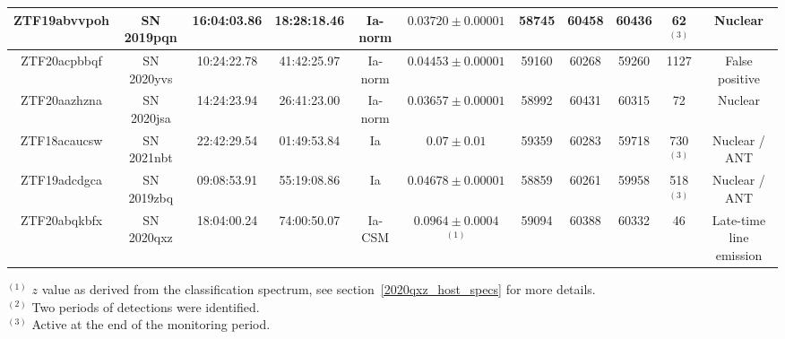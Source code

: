 \documentclass[a4paper,oneside,12pt, class=Latex/Classes/PhDthesisPSnPDF, crop=false]{standalone}
\begin{document}
\begin{table}
{\begin{tabular}{ccccccccccc}
        ZTF19abvvpoh & SN 2019pqn & 16:04:03.86 & 18:28:18.46 & Ia-norm & $0.03720\pm0.00001$ & 58745 & 60458 & 60436 & 62 $^{(3)}$ & Nuclear\\
        \hline
        ZTF20acpbbqf & SN 2020yvs & 10:24:22.78 & 41:42:25.97 & Ia-norm & $0.04453\pm0.00001$ & 59160 & 60268 & 59260 & 1127 & False positive\\
        ZTF20aazhzna & SN 2020jsa & 14:24:23.94 & 26:41:23.00 & Ia-norm & $0.03657\pm0.00001$ & 58992 & 60431 & 60315 & 72 & Nuclear\\
        ZTF18acaucsw & SN 2021nbt & 22:42:29.54 & 01:49:53.84 & Ia & $0.07\pm0.01$ & 59359 & 60283 & 59718 & 730 $^{(3)}$ & Nuclear / ANT\\
        ZTF19adcdgca & SN 2019zbq & 09:08:53.91 & 55:19:08.86 & Ia & $0.04678\pm0.00001$ & 58859 & 60261 & 59958 & 518 $^{(3)}$ & Nuclear / ANT \\
        ZTF20abqkbfx & SN 2020qxz & 18:04:00.24 & 74:00:50.07 & Ia-CSM & $0.0964\pm0.0004$ $^{(1)}$ & 59094 & 60388 & 60332 & 46 & Late-time line emission \\
        \hline
    \end{tabular}
    }
    \begin{flushleft}
        $^{(1)}$ $z$ value as derived from the classification spectrum, see section~\ref{2020qxz_host_specs} for more details.\\
        $^{(2)}$ Two periods of detections were identified.\\
        $^{(3)}$ Active at the end of the monitoring period.
    \end{flushleft}
    \label{found_objs}
\end{table}
\end{document}
